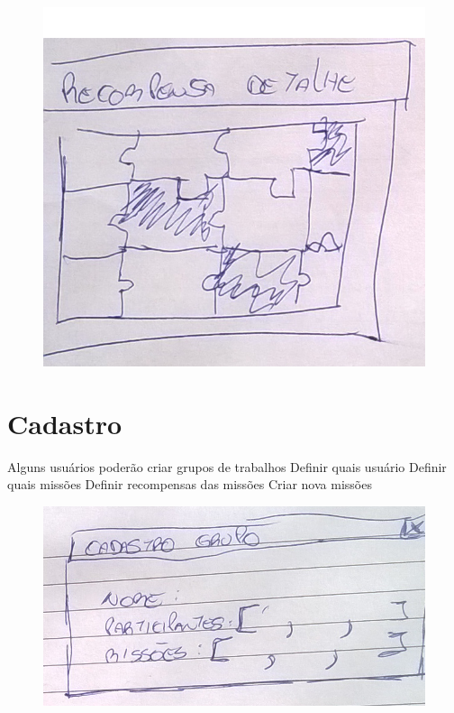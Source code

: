 \documentclass[
	12pt,				%
	oneside,			%
	a4paper,			%
	english,			%
	french,				%
	spanish,			%
	brazil,				%
	]{abntex2}
\begin{document}
\begin{figure}[ht]
\centering
\includegraphics[width=1\textwidth]{imagens/proposta_recompensa_detalhe.png}
\end{figure}

\section{Cadastro}


Alguns usuários poderão criar grupos de trabalhos
Definir quais usuário
Definir quais missões
Definir recompensas das missões
Criar nova missões

\begin{figure}[ht]
\centering
\includegraphics[width=1\textwidth]{imagens/proposta_cadastro.png}
\end{figure}
\end{document}
